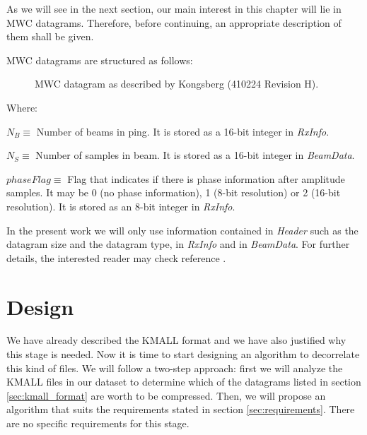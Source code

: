 As we will see in the next section, our main interest in this chapter will lie in MWC datagrams. Therefore, before continuing, an appropriate description of them shall be given.

\pagebreak
MWC datagrams are structured as follows:

\begin{figure}[h!]
	\begin{center}
		\scalebox{.565}{}
	\end{center}
	\caption{MWC datagram as described by Kongsberg (410224 Revision H).}
	\label{fig:mwc_datagram}
\end{figure}
Where:
\begin{description}
	\item $N_B \equiv$ Number of beams in ping. It is stored as a 16-bit integer in \textit{RxInfo}.
	\item $N_S \equiv$ Number of samples in beam. It is stored as a 16-bit integer in \textit{BeamData}.
	\item $phaseFlag \equiv$ Flag that indicates if there is phase information after amplitude samples. It may be 0 (no phase information), 1 (8-bit resolution) or 2 (16-bit resolution). It is stored as an 8-bit integer in \textit{RxInfo}.
\end{description}

In the present work we will only use information contained in \textit{Header} such as the datagram size and the datagram type, in \textit{RxInfo} and in \textit{BeamData}. For further details, the interested reader may check reference \parencite{KMALL}.

\section{Design}
We have already described the KMALL format and we have also justified why this stage is needed. Now it is time to start designing an algorithm to decorrelate this kind of files. We will follow a two-step approach: first we will analyze the KMALL files in our dataset to determine which of the datagrams listed in section \ref{sec:kmall_format} are worth to be compressed. Then, we will propose an algorithm that suits the requirements stated in section \ref{sec:requirements}. There are no specific requirements for this stage.

